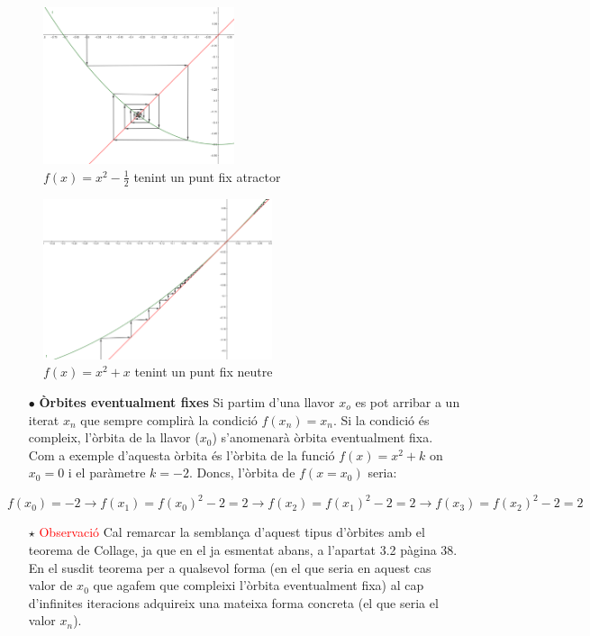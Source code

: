 \documentclass[12pt]{report}
\begin{document}
\begin{figure}
\centering
        \includegraphics[width=0.5\textwidth]{f(x)atractor.PNG}
        \caption{$f(x)=x^2-\frac{1}{2}$ tenint un punt fix atractor}
        \label{fig:my_label}
    \end{figure}
    \begin{figure}
\centering
        \includegraphics[width=0.6\textwidth]{f(x)neutre.PNG}
        \caption{$f(x)=x^2+x$ tenint un punt fix neutre}
        \label{fig:my_label}
    \end{figure}
\newpage
\begin{itemize}
    \item [$\bullet$] \textbf{Òrbites eventualment fixes}
    \newline
    Si partim d'una llavor $x_o$ es pot arribar a un iterat $x_n$ que sempre complirà la condició $f(x_n)=x_n$. Si la condició és compleix, l'òrbita de la llavor ($x_0$) s'anomenarà òrbita eventualment fixa. Com a exemple d'aquesta òrbita és l'òrbita de la funció $f(x)= x^2+k$ on $x_0=0$ i el paràmetre $k=-2$. Doncs, l'òrbita de $f(x=x_0)$ seria:
\end{itemize}
$$f(x_0)=-2 \rightarrow f(x_1)= f(x_0)^2-2= 2 \rightarrow f(x_2)=f(x_1)^2-2=2 \rightarrow f(x_3)= f(x_2)^2-2=2$$
\begin{itemize}
    \item [$\star$] \textcolor{red}{Observació}
    \newline
   Cal remarcar la semblança d'aquest tipus d'òrbites amb el teorema de Collage, ja que en el ja esmentat abans, a l'apartat 3.2 pàgina 38. En el susdit teorema per a qualsevol forma (en el que seria en aquest cas valor de $x_0$ que agafem que compleixi l'òrbita eventualment fixa) al cap d'infinites iteracions adquireix una mateixa forma concreta (el que seria el valor $x_n$).
\end{itemize}
\end{document}
